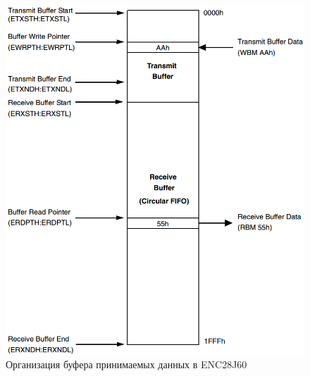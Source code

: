 \begin{figure}[H]
	\centering
		\includegraphics[scale=0.45]{img/encethbuff.png}
	\caption{Организация буфера принимаемых данных в ENC28J60\label{fig:encethbuff} \cite{enc28j60datasheet}}
\end{figure}





